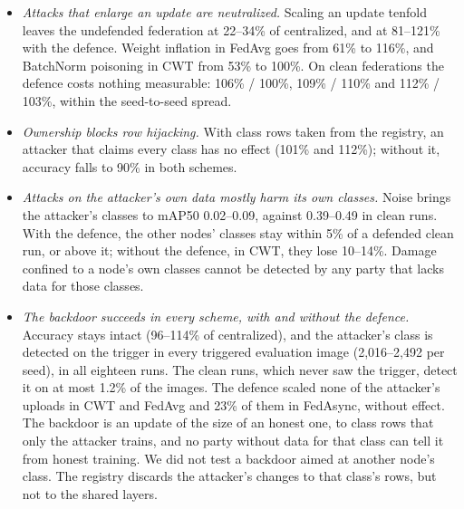 \documentclass[pdflatex,sn-mathphys-num]{sn-jnl}
\begin{document}
\begin{itemize}
\item \emph{Attacks that enlarge an update are neutralized.} Scaling an update tenfold leaves the undefended federation at 22--34\% of centralized, and at 81--121\% with the defence. Weight inflation in FedAvg goes from 61\% to 116\%, and BatchNorm poisoning in CWT from 53\% to 100\%. On clean federations the defence costs nothing measurable: 106\% / 100\%, 109\% / 110\% and 112\% / 103\%, within the seed-to-seed spread.
\item \emph{Ownership blocks row hijacking.} With class rows taken from the registry, an attacker that claims every class has no effect (101\% and 112\%); without it, accuracy falls to 90\% in both schemes.
\item \emph{Attacks on the attacker's own data mostly harm its own classes.} Noise brings the attacker's classes to mAP50 0.02--0.09, against 0.39--0.49 in clean runs. With the defence, the other nodes' classes stay within 5\% of a defended clean run, or above it; without the defence, in CWT, they lose 10--14\%. Damage confined to a node's own classes cannot be detected by any party that lacks data for those classes.
\item \emph{The backdoor succeeds in every scheme, with and without the defence.} Accuracy stays intact (96--114\% of centralized), and the attacker's class is detected on the trigger in every triggered evaluation image (2,016--2,492 per seed), in all eighteen runs. The clean runs, which never saw the trigger, detect it on at most 1.2\% of the images. The defence scaled none of the attacker's uploads in CWT and FedAvg and 23\% of them in FedAsync, without effect. The backdoor is an update of the size of an honest one, to class rows that only the attacker trains, and no party without data for that class can tell it from honest training. We did not test a backdoor aimed at another node's class. The registry discards the attacker's changes to that class's rows, but not to the shared layers.

\end{itemize}
\end{document}
